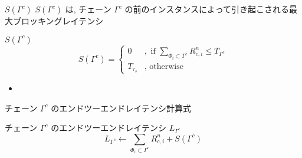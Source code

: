 \begin{frame}{$S\left(\Gamma^{c}\right)$}
    $S\left(\Gamma^{c}\right)$ は, チェーン $\Gamma^{c}$ の前のインスタンスによって引き起こされる最大ブロッキングレイテンシ
    \begin{block}{$S\left(\Gamma^{c}\right)$}
        \begin{equation*}
            S\left(\Gamma^{c}\right)= \begin{cases}0 &, \text { if } \sum_{\Phi_{i} \subset \Gamma^{c}} R_{c, i}^{n} \leq T_{\Gamma^{c}} \\ T_{\tau_{s}} &, \text { otherwise }\end{cases}
        \end{equation*}

        \setlength{\linewidth}{0.98\columnwidth}
        \begin{itemize}
            \item {}
        \end{itemize}
    \end{block}
\end{frame}

\begin{frame}{チェーン $\Gamma^{c}$ のエンドツーエンドレイテンシ計算式}
    \begin{block}{チェーン $\Gamma^{c}$ のエンドツーエンドレイテンシ $L_{\Gamma^{c}}$}
        \begin{equation*}
            L_{\Gamma^{c}} \leftarrow \sum_{\Phi_{i} \subset \Gamma^{c}} R_{c, i}^{n}+S\left(\Gamma^{c}\right)
        \end{equation*}
    \end{block}
\end{frame}


